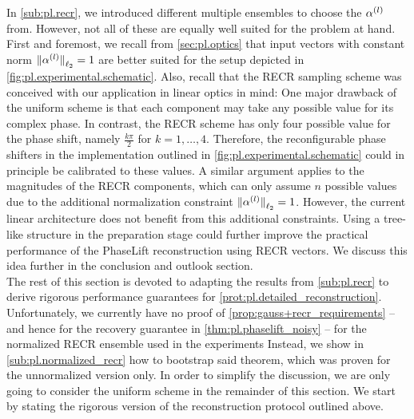 In \cref{sub:pl.recr}, we introduced different multiple ensembles to choose the $\alpha^{(l)}$ from.
However, not all of these are equally well suited for the problem at hand.
First and foremost, we recall from \cref{sec:pl.optics} that input vectors with constant norm ${\Vert\alpha^{(l)}\Vert}_{\ell_2} = 1$ are better suited for the setup depicted in \cref{fig:pl.experimental.schematic}.
Also, recall that the RECR sampling scheme was conceived with our application in linear optics in mind:
One major drawback of the uniform scheme is that each component may take any possible value for its complex phase.
In contrast, the RECR scheme has only four possible value for the phase shift, namely $\frac{k \pi}{2}$ for $k=1,\ldots,4$.
Therefore, the reconfigurable phase shifters in the implementation outlined in \cref{fig:pl.experimental.schematic} could in principle be calibrated to these values.
A similar argument applies to the magnitudes of the RECR components, which can only assume $n$ possible values due to the additional normalization constraint ${\Vert\alpha^{(l)}\Vert}_{\ell_2} = 1$.
However, the current linear architecture does not benefit from this additional constraints.
Using a tree-like structure in the preparation stage could further improve the practical performance of the PhaseLift reconstruction using RECR vectors.
We discuss this idea further in the conclusion and outlook section.\\



The rest of this section is devoted to adapting the results from \cref{sub:pl.recr} to derive rigorous performance guarantees for \cref{prot:pl.detailed_reconstruction}.
Unfortunately, we currently have no proof of \cref{prop:gauss+recr_requirements} -- and hence for the recovery guarantee in \cref{thm:pl.phaselift_noisy} -- for the normalized RECR ensemble used in the experiments
Instead, we show in \cref{sub:pl.normalized_recr} how to bootstrap said theorem, which was proven for the unnormalized version only.
In order to simplify the discussion, we are only going to consider the uniform scheme in the remainder of this section.
We start by stating the rigorous version of the reconstruction protocol outlined above.

